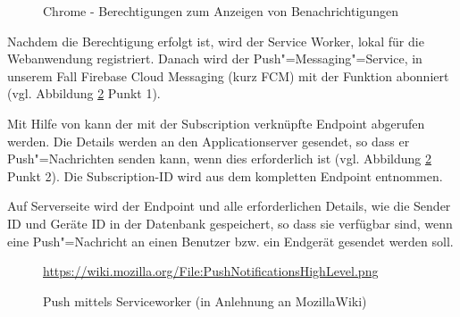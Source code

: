 \begin{figure}[htp] 
\caption{Chrome - Berechtigungen zum Anzeigen von Benachrichtigungen}
\label{image_konzeption_notification-permission}
\end{figure} 

Nachdem die Berechtigung erfolgt ist, wird der Service Worker, lokal  für die Webanwendung registriert. 
Danach wird der Push"=Messaging"=Service, in unserem Fall \glqq Firebase Cloud Messaging\grqq{} (kurz FCM) mit der Funktion  abonniert (vgl. Abbildung \ref{image_konzeption_architektur-serviceworker-push} Punkt 1). 

Mit Hilfe von  kann der mit der Subscription verknüpfte Endpoint abgerufen werden. Die Details werden an den Applicationserver gesendet, so dass er Push"=Nachrichten senden kann, wenn dies erforderlich ist (vgl. Abbildung \ref{image_konzeption_architektur-serviceworker-push} Punkt 2). Die Subscription-ID wird aus dem kompletten Endpoint entnommen. 

Auf Serverseite wird der Endpoint und alle erforderlichen Details, wie die Sender ID und Geräte ID in der Datenbank gespeichert, so dass sie verfügbar sind, wenn eine Push"=Nachricht an einen Benutzer bzw. ein Endgerät gesendet werden soll. \\

\begin{figure}[htp] 
\caption{Push mittels Serviceworker (in Anlehnung an MozillaWiki)}
\quelle\url{https://wiki.mozilla.org/File:PushNotificationsHighLevel.png}
\label{image_konzeption_architektur-serviceworker-push}
\end{figure} 

